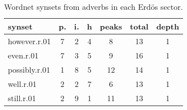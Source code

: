 \begin{table}[h!]
\begin{center}
\begin{tabular}{| l || c | c | c || c | c | c |}\hline
{\bf synset} & {\bf p.} & {\bf i.} & {\bf h} & {\bf peaks} & {\bf total} & {\bf depth} \\\hline\hline
however.r.01 & 7  & 2  & 4  & 8  & 13  & 1 \\
even.r.01 & 7  & 3  & 5  & 9  & 16  & 1 \\
possibly.r.01 & 1  & 8  & 5  & 12  & 14  & 1 \\
well.r.01 & 2  & 2  & 7  & 6  & 13  & 1 \\
still.r.01 & 2  & 9  & 1  & 11  & 13  & 1 \\\hline
\end{tabular}
\caption{Wordnet synsets from adverbs in each Erd\"os sector.}
\end{center}
\end{table}